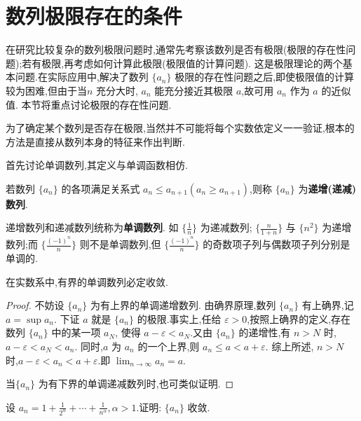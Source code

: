 \section{数列极限存在的条件}

在研究比较复杂的数列极限问题时,通常先考察该数列是否有极限(极限的存在性问题);若有极限,再考虑如何计算此极限(极限值的计算问题). 这是极限理论的两个基本问题.在实际应用中,解决了数列 $\{a_n\}$ 极限的存在性问题之后,即使极限值的计算较为困难,但由于当$n$ 充分大时, $a_n$ 能充分接近其极限 $a$,故可用 $a_n$ 作为 $a$ 的近似值. 本节将重点讨论极限的存在性问题.

为了确定某个数列是否存在极限,当然并不可能将每个实数依定义一一验证,根本的方法是直接从数列本身的特征来作出判断.

首先讨论单调数列,其定义与单调函数相仿.

\begin{definition}[单调数列]
    若数列 $\{a_n\}$ 的各项满足关系式 $a_n\le a_{n+1} (a_n\ge a_{n+1})$,则称 $\{a_n\}$ 为\textbf{递增(递减)数列}.
\end{definition}

递增数列和递减数列统称为\textbf{单调数列}. 如 $\{\frac{1}{n}\}$ 为递减数列; $\{\frac{n}{1+n}\}$ 与 $\{n^2\}$ 为递增数列;而 $\{\frac{(-1)^n}{n}\}$  则不是单调数列,但 $\{\frac{(-1)^n}{n}\}$ 的奇数项子列与偶数项子列分别是单调的.

\begin{theorem}[单调有界定理]
    在实数系中,有界的单调数列必定收敛.
\end{theorem}

\begin{proof}
    不妨设 $\{a_n\}$ 为有上界的单调递增数列. 由确界原理,数列 $\{a_n\}$ 有上确界,记 $a=\sup {a_n}$. 下证 $a$ 就是 $\{a_n\}$ 的极限.事实上,任给 $\varepsilon>0$,按照上确界的定义,存在数列 $\{a_n\}$ 中的某一项 $a_N$, 使得 $a-\varepsilon<a_N$.又由 $\{a_n\}$ 的递增性,有 $n>N$ 时, $a-\varepsilon<a_N<a_n$. 同时,$a$ 为 $a_n$ 的一个上界,则 $a_n\le a<a+\varepsilon$. 综上所述, $n>N$ 时,$a-\varepsilon<a_n<a+\varepsilon$.即 $\lim_{n\to\infty} a_n=a$.
    
    当$\{a_n\}$ 为有下界的单调递减数列时,也可类似证明.
\end{proof}

\begin{example}
    设 $a_n=1+\frac{1}{2^\alpha}+\cdots+\frac{1}{n^{\alpha}},\alpha>1$.证明: $\{a_n\}$ 收敛.
\end{example}


